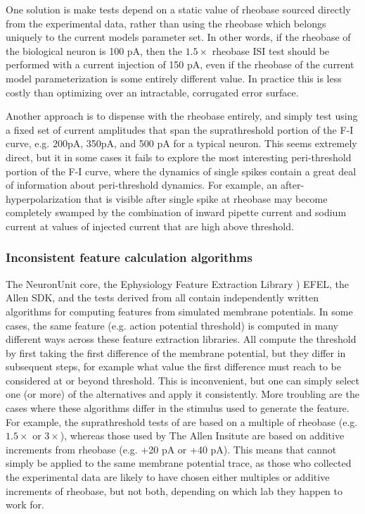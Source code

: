 One solution is make tests depend on a static value of rheobase sourced directly from the experimental data, rather than using the rheobase which belongs uniquely to the current models parameter set.
In other words, if the rheobase of the biological neuron is 100 pA, then the $1.5\times$ rheobase ISI test should be performed with a current injection of 150 pA, even if the rheobase of the current model parameterization is some entirely different value.
In practice this is less costly than optimizing over an intractable, corrugated error surface.


Another approach is to dispense with the rheobase entirely, and simply test using a fixed set of current amplitudes that span the suprathreshold portion of the F-I curve, e.g. 200pA, 350pA, and 500 pA for a typical neuron.
This seems extremely direct, but it in some cases it fails to explore the most interesting peri-threshold portion of the F-I curve, where the dynamics of single spikes contain a great deal of information about peri-threshold dynamics.
For example, an after-hyperpolarization that is visible after single spike at rheobase may become completely swamped by the combination of inward pipette current and sodium current at values of injected current that are high above threshold.

\subsubsection{Inconsistent feature calculation algorithms}
The NeuronUnit core, the Ephysiology Feature Extraction Library \cite{EFEL}) EFEL, the Allen SDK, and the tests derived from \cite{druckmann2008evaluating} all contain independently written algorithms for computing features from simulated membrane potentials.
In some cases, the same feature (e.g. action potential threshold) is computed in many different ways across these feature extraction libraries.
All compute the threshold by first taking the first difference of the membrane potential, but they differ in subsequent steps, for example what value the first difference must reach to be considered at or beyond threshold.
This is inconvenient, but one can simply select one (or more) of the alternatives and apply it consistently.
More troubling are the cases where these algorithms differ in the stimulus used to generate the feature.
For example, the suprathreshold tests of \cite{druckmann2008evaluating} are based on a multiple of rheobase (e.g. $1.5\times$ or $3\times$), whereas those used by The Allen Insitute are based on additive increments from rheobase (e.g. +20 pA or +40 pA).
This means that cannot simply be applied to the same membrane potential trace, as those who collected the experimental data are likely to have chosen either multiples or additive increments of rheobase, but not both, depending on which lab they happen to work for.

